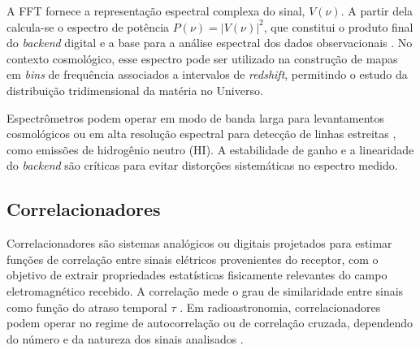 A FFT fornece a representação espectral complexa do sinal, \(V(\nu)\). A partir dela calcula-se o espectro de potência \(P(\nu)=|V(\nu)|^{2}\), que constitui o produto final do \textit{backend} digital e a base para a análise espectral dos dados observacionais \cite{burke2019introduction}. No contexto cosmológico, esse espectro pode ser utilizado na construção de mapas em \textit{bins} de frequência associados a intervalos de \textit{redshift}, permitindo o estudo da distribuição tridimensional da matéria no Universo.

Espectrômetros podem operar em modo de banda larga para levantamentos cosmológicos ou em alta resolução espectral para detecção de linhas estreitas \cite{burke2019introduction, wilson2013tools}, como emissões de hidrogênio neutro (HI). A estabilidade de ganho e a linearidade do \textit{backend} são críticas para evitar distorções sistemáticas no espectro medido.
\subsection{Correlacionadores}

Correlacionadores são sistemas analógicos ou digitais projetados para estimar funções de correlação entre sinais elétricos provenientes do receptor, com o objetivo de extrair propriedades estatísticas fisicamente relevantes do campo eletromagnético recebido. A correlação mede o grau de similaridade entre sinais como função do atraso temporal $\tau$ \cite{thompson2017interferometry}.
Em radioastronomia, correlacionadores podem operar no regime de autocorrelação ou de correlação cruzada, dependendo do número e da natureza dos sinais analisados \cite{Hagen2002}.


